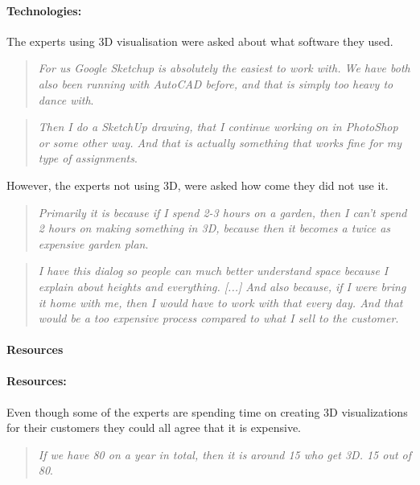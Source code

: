 		\paragraph*{Technologies:}
		The experts using 3D visualisation were asked about what software they used.
		\begin{quote}
			\textit{For us Google Sketchup is absolutely the easiest to work with. We have both also been running with AutoCAD before, and that is simply too heavy to dance with}\label{quote:expertTech1}.\\
		\end{quote}
		
		\begin{quote}
			\textit{Then I do a SketchUp drawing, that I continue working on in PhotoShop or some other way. And that is actually something that works fine for my type of assignments}\label{quote:expertTech2}.\\
		\end{quote}
		However, the experts not using 3D, were asked how come they did not use it.
		\begin{quote}
			\textit{Primarily it is because if I spend 2-3 hours on a garden, then I can't spend 2 hours on making something in 3D, because then it becomes a twice as expensive garden plan}\label{quote:expertTech3}.\\
		\end{quote}
		\begin{quote}
			\textit{I have this dialog so people can much better understand space because I explain about heights and everything. [...] And also because, if I were bring it home with me, then I would have to work with that every day. And that would be a too expensive process compared to what I sell to the customer}\label{quote:expertTech4}.\\
		\end{quote}
		


		\paragraph*{Resources}

		\paragraph*{Resources:}

		Even though some of the experts are spending time on creating 3D visualizations for their customers they could all agree that it is expensive.
		\begin{quote}
			\textit{If we have 80 on a year in total, then it is around 15 who get 3D. 15 out of 80}\label{quote:expertRessources1}.\\
		\end{quote}
		
